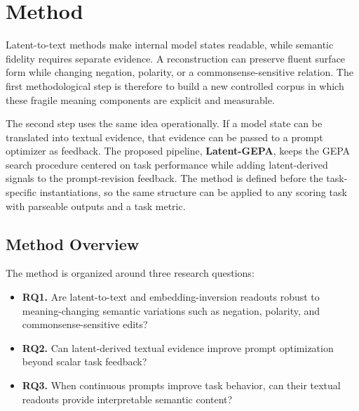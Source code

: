 \documentclass[12pt,a4paper,twoside,openright]{book}
\begin{document}
\chapter{Method}
\label{chapter:method}

Latent-to-text methods make internal model states readable, while semantic
fidelity requires separate evidence. A reconstruction can preserve fluent
surface form while changing negation, polarity, or a commonsense-sensitive
relation. The first methodological step is therefore to build a new controlled
corpus in which these fragile meaning components are explicit and measurable.

The second step uses the same idea operationally. If a model state can be
translated into textual evidence, that evidence can be passed to a prompt
optimizer as feedback. The proposed pipeline, \textbf{Latent-GEPA}, keeps the
GEPA search procedure centered on task performance while adding latent-derived
signals to the prompt-revision feedback. The method is defined before the
task-specific instantiations, so the same structure can be applied to any
scoring task with parseable outputs and a task metric.

\section{Method Overview}
\label{sec:method-overview}

The method is organized around three research questions:

\begin{itemize}
    \item \textbf{RQ1.} Are latent-to-text and embedding-inversion readouts
    robust to meaning-changing semantic variations such as negation, polarity,
    and commonsense-sensitive edits?
    \item \textbf{RQ2.} Can latent-derived textual evidence improve prompt
    optimization beyond scalar task feedback?
    \item \textbf{RQ3.} When continuous prompts improve task behavior, can their
    textual readouts provide interpretable semantic content?
\end{itemize}
\end{document}
